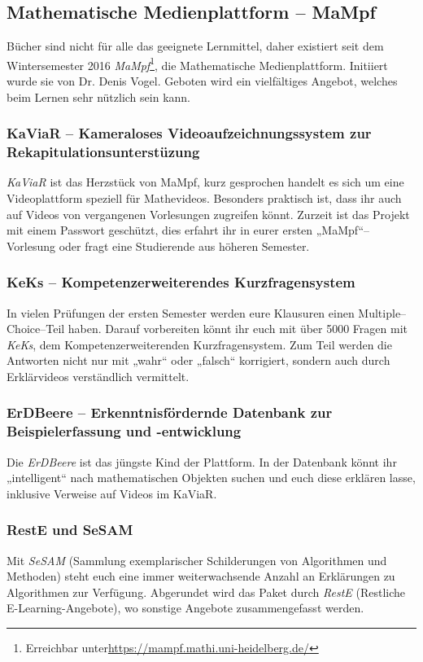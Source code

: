 \subsection{Mathematische Medienplattform -- MaMpf}
\label{mampf}

Bücher sind nicht für alle das geeignete Lernmittel, daher existiert seit dem Wintersemester 2016 \emph{MaMpf}\footnote{Erreichbar unter\url{https://mampf.mathi.uni-heidelberg.de/}}, die Mathematische Medienplattform. Initiiert wurde sie von Dr. Denis Vogel. Geboten wird ein vielfältiges Angebot, welches beim Lernen sehr nützlich sein kann.

\subsubsection{KaViaR -- Kameraloses Videoaufzeichnungssystem zur Rekapitulationsunterstüzung}
\emph{KaViaR} ist das Herzstück von MaMpf, kurz gesprochen handelt es sich um eine Videoplattform speziell für Mathevideos. Besonders praktisch ist, dass ihr auch auf Videos von vergangenen Vorlesungen zugreifen könnt. Zurzeit ist das Projekt  mit einem Passwort geschützt, dies erfahrt ihr in eurer ersten „MaMpf“--Vorlesung oder fragt eine Studierende aus höheren Semester.

\subsubsection{KeKs -- Kompetenzerweiterendes Kurzfragensystem}
In vielen Prüfungen der ersten Semester werden eure Klausuren einen Multiple--Choice--Teil haben. Darauf vorbereiten könnt ihr euch mit über 5000 Fragen mit \emph{KeKs}, dem Kompetenzerweiterenden Kurzfragensystem. Zum Teil werden die Antworten nicht nur mit „wahr“ oder „falsch“ korrigiert, sondern auch durch Erklärvideos verständlich vermittelt.

\subsubsection{ErDBeere -- Erkenntnisfördernde Datenbank zur Beispielerfassung und -entwicklung}
 Die \emph{ErDBeere} ist das jüngste Kind der Plattform. In der Datenbank könnt ihr „intelligent“ nach mathematischen Objekten suchen und   euch diese erklären lasse, inklusive Verweise auf Videos im KaViaR.

\subsubsection{RestE und SeSAM}
Mit \emph{SeSAM} (Sammlung exemplarischer Schilderungen von Algorithmen und Methoden) steht euch eine immer weiterwachsende Anzahl an Erklärungen zu Algorithmen zur Verfügung. Abgerundet wird das Paket durch \emph{RestE} (Restliche E-Learning-Angebote), wo sonstige Angebote zusammengefasst werden.
